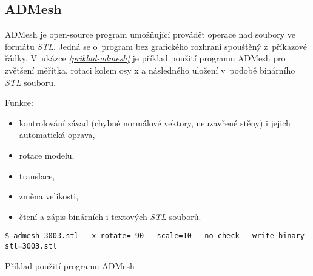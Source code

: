 \subsection{ADMesh}\label{podsekce-admesh}
ADMesh \autocite{ADMesh} je open-source program umožňující provádět operace nad soubory ve formátu \textit{\gls{STL}}. Jedná se o~program bez grafického rozhraní spouštěný z~příkazové řádky. V~ukázce \emph{\ref{priklad-admesh}} je příklad použití programu ADMesh pro zvětšení měřítka, rotaci kolem osy x a následného uložení v~podobě binárního \textit{\gls{STL}} souboru.

Funkce:
\begin{itemize}
    \item kontrolování závad (chybné normálové vektory, neuzavřené stěny) i jejich automatická oprava,
    \item rotace modelu,
    \item translace,
    \item změna velikosti,
    \item čtení a zápis binárních i textových \textit{\gls{STL}} souborů.
\end{itemize}

\begin{listing}[htbp]
        \begin{verbatim}
$ admesh 3003.stl --x-rotate=-90 --scale=10 --no-check --write-binary-stl=3003.stl
        \end{verbatim}
    \caption{Příklad použití programu ADMesh \label{priklad-admesh}}
\end{listing}
